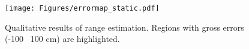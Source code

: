 \begin{figure}[t]
    \centering
        \texttt{[image: Figures/errormap\_static.pdf]}
        
        \caption{Qualitative results of range estimation. Regions with gross errors (-100 \bwrDyNFL~100 cm) are highlighted.
        }
    \label{fig:error_map}
\end{figure}